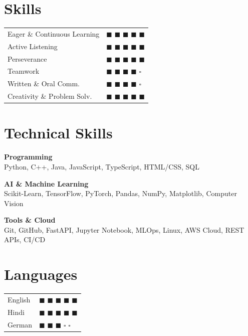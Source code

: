 \documentclass[10pt,a4paper]{article}
\newenvironment{rightcolumn}{\begin{minipage}[t]{0.34\textwidth}}{\end{minipage}}
\begin{document}
\begin{rightcolumn}

\section*{Skills}
{\small
\begin{tabular}{@{}ll}
Eager \& Continuous Learning & $\blacksquare$ $\blacksquare$ $\blacksquare$ $\blacksquare$ $\blacksquare$ \\
Active Listening & $\blacksquare$ $\blacksquare$ $\blacksquare$ $\blacksquare$ $\blacksquare$ \\
Perseverance & $\blacksquare$ $\blacksquare$ $\blacksquare$ $\blacksquare$ $\blacksquare$ \\
Teamwork & $\blacksquare$ $\blacksquare$ $\blacksquare$ $\blacksquare$ $\square$ \\
Written \& Oral Comm. & $\blacksquare$ $\blacksquare$ $\blacksquare$ $\blacksquare$ $\square$ \\
Creativity \& Problem Solv. & $\blacksquare$ $\blacksquare$ $\blacksquare$ $\blacksquare$ $\blacksquare$ \\
\end{tabular}
}

\section*{Technical Skills}

\textbf{Programming} \\
Python, C++, Java, JavaScript, TypeScript, HTML/CSS, SQL

\vspace{6pt}
\textbf{AI \& Machine Learning} \\
Scikit-Learn, TensorFlow, PyTorch, Pandas, NumPy, Matplotlib, Computer Vision

\vspace{6pt}
\textbf{Tools \& Cloud} \\
Git, GitHub, FastAPI, Jupyter Notebook, MLOps, Linux, AWS Cloud, REST APIs, CI/CD

\section*{Languages}
{\small
\begin{tabular}{@{}ll}
English & $\blacksquare$ $\blacksquare$ $\blacksquare$ $\blacksquare$ $\blacksquare$ \\
Hindi   & $\blacksquare$ $\blacksquare$ $\blacksquare$ $\blacksquare$ $\blacksquare$ \\
German  & $\blacksquare$ $\blacksquare$ $\blacksquare$ $\square$ $\square$ \\
\end{tabular}
}


\end{rightcolumn}
\end{document}
